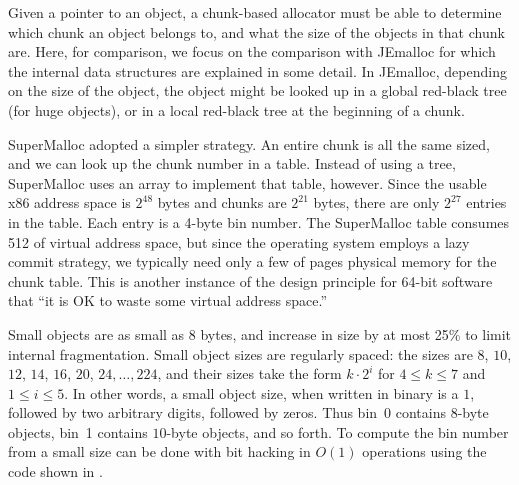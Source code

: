 \documentclass{sigplanconf}
\begin{document}
Given a pointer to an object, a chunk-based allocator must be able to
determine which chunk an object belongs to, and what the size of the
objects in that chunk are.  Here, for comparison, we focus on the
comparison with JEmalloc for which the internal data structures are
explained in some detail.  In JEmalloc, depending on the size of the
object, the object might be looked up in a global red-black tree (for
huge objects), or in a local red-black tree at the beginning of a
chunk.

SuperMalloc adopted a simpler strategy.  An entire chunk is all the
same sized, and we can look up the chunk number in a table.  Instead
of using a tree, SuperMalloc uses an array to implement that table,
however.  Since the usable x86 address space is $2^{48}$ bytes and
chunks are $2^{21}$ bytes, there are only $2^{27}$ entries in the
table.  Each entry is a 4-byte bin number.  The SuperMalloc table
consumes \unit{512}\mebi\byte{} of virtual address space, but since
the operating system employs a lazy commit strategy, we typically need
only a few of pages physical memory for the chunk table.  This is
another instance of the design principle for 64-bit software that ``it
is OK to waste some virtual address space.''


Small objects are as small as 8 bytes, and increase in size by at most
25\% to limit internal fragmentation.  Small object sizes are
regularly spaced: the sizes are $8$, $10$, $12$, $14$, $16$, $20$,
$24, \ldots, 224$, and their sizes take the form $k\cdot2^i$ for
$4\leq k \leq 7$ and $1\leq i \leq 5$.  In other words, a small object
size, when written in binary is a $1$, followed by two arbitrary
digits, followed by zeros.  Thus bin~$0$ contains $8$-byte objects,
bin~1 contains $10$-byte objects, and so forth.  To compute the bin
number from a small size can be done with bit hacking in $O(1)$
operations using the code shown in .
\end{document}

